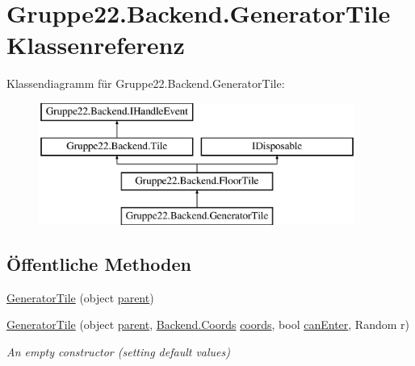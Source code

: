 \hypertarget{class_gruppe22_1_1_backend_1_1_generator_tile}{\section{Gruppe22.\-Backend.\-Generator\-Tile Klassenreferenz}
\label{class_gruppe22_1_1_backend_1_1_generator_tile}
}
Klassendiagramm für Gruppe22.\-Backend.\-Generator\-Tile\-:\begin{figure}[H]
\begin{center}
\leavevmode
\includegraphics[height=4.000000cm]{class_gruppe22_1_1_backend_1_1_generator_tile}
\end{center}
\end{figure}
\subsection*{Öffentliche Methoden}
\begin{DoxyCompactItemize}
\item 
\hyperlink{class_gruppe22_1_1_backend_1_1_generator_tile_ab9314b37ebdeb42982a0eb130118729f}{Generator\-Tile} (object \hyperlink{class_gruppe22_1_1_backend_1_1_tile_abc12933c70eb3a2ebbb2fde9f45c2632}{parent})
\item 
\hyperlink{class_gruppe22_1_1_backend_1_1_generator_tile_a58aa521b8a1fa31e489c970d43f5a6c1}{Generator\-Tile} (object \hyperlink{class_gruppe22_1_1_backend_1_1_tile_abc12933c70eb3a2ebbb2fde9f45c2632}{parent}, \hyperlink{class_gruppe22_1_1_backend_1_1_coords}{Backend.\-Coords} \hyperlink{class_gruppe22_1_1_backend_1_1_floor_tile_a222af0c5d8ea6b7d24d04a384f71d70b}{coords}, bool \hyperlink{class_gruppe22_1_1_backend_1_1_floor_tile_a07516e27f9669dd9e852cf42a1a94635}{can\-Enter}, Random r)
\begin{DoxyCompactList}\small\item\em An empty constructor (setting default values) \end{DoxyCompactList}\end{DoxyCompactItemize}
